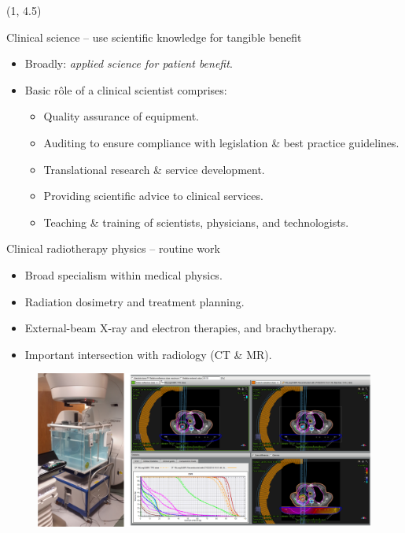 \documentclass[final, unknownkeysallowed]{beamer}
\begin{document}
\begin{frame}{}
%
\begin{textblock}{19.5}(1, 4.5)
    \begin{block}{Clinical science -- use scientific knowledge for tangible benefit}
        \begin{itemize}
            \item Broadly: \textit{applied science for patient benefit}.
            \item Basic r\^{o}le of a clinical scientist comprises:
                \begin{itemize}
                    \item Quality assurance of equipment.
                    \item Auditing to ensure compliance with legislation \& best practice guidelines.
                    \item Translational research \& service development.
                    \item Providing scientific advice to clinical services.
                    \item Teaching \& training of scientists, physicians, and technologists.
                \end{itemize}
        \end{itemize}
    \end{block}
%
    \begin{block}{Clinical radiotherapy physics -- routine work}
        \begin{itemize}
            \item Broad specialism within medical physics.
            \item Radiation dosimetry and treatment planning.
            \item External-beam X-ray and electron therapies, and brachytherapy.
            \item Important intersection with radiology (CT \& MR).
        \end{itemize}
        \begin{figure}
            \includegraphics[width = \textwidth]{rt_physics_gamma.png}

\end{figure}
\end{block}
\end{textblock}
\end{frame}
\end{document}
